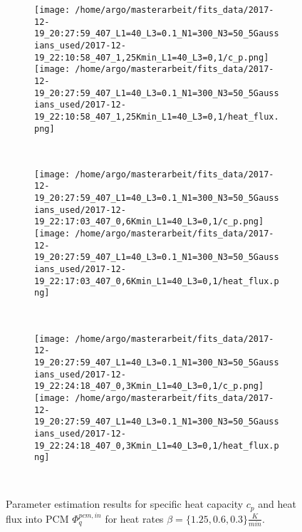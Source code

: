 \documentclass{scrartcl}[12pt, halfparskip]
\numberwithin{equation}{section}
\numberwithin{figure}{section}
\numberwithin{table}{section}
\begin{document}
\begin{figure}[H]
	\begin{subfigure}{1.\textwidth}
		\texttt{[image: /home/argo/masterarbeit/fits\_data/2017-12-19\_20:27:59\_407\_L1=40\_L3=0.1\_N1=300\_N3=50\_5Gaussians\_used/2017-12-19\_22:10:58\_407\_1,25Kmin\_L1=40\_L3=0,1/c\_p.png]}
		\texttt{[image: /home/argo/masterarbeit/fits\_data/2017-12-19\_20:27:59\_407\_L1=40\_L3=0.1\_N1=300\_N3=50\_5Gaussians\_used/2017-12-19\_22:10:58\_407\_1,25Kmin\_L1=40\_L3=0,1/heat\_flux.png]}
	\end{subfigure} \\[1ex]
	
	
	\begin{subfigure}{1.\textwidth}
		\texttt{[image: /home/argo/masterarbeit/fits\_data/2017-12-19\_20:27:59\_407\_L1=40\_L3=0.1\_N1=300\_N3=50\_5Gaussians\_used/2017-12-19\_22:17:03\_407\_0,6Kmin\_L1=40\_L3=0,1/c\_p.png]}
		\texttt{[image: /home/argo/masterarbeit/fits\_data/2017-12-19\_20:27:59\_407\_L1=40\_L3=0.1\_N1=300\_N3=50\_5Gaussians\_used/2017-12-19\_22:17:03\_407\_0,6Kmin\_L1=40\_L3=0,1/heat\_flux.png]}
	\end{subfigure} \\[1ex]
	
	
	\begin{subfigure}{1.\textwidth}
		\texttt{[image: /home/argo/masterarbeit/fits\_data/2017-12-19\_20:27:59\_407\_L1=40\_L3=0.1\_N1=300\_N3=50\_5Gaussians\_used/2017-12-19\_22:24:18\_407\_0,3Kmin\_L1=40\_L3=0,1/c\_p.png]}
		\texttt{[image: /home/argo/masterarbeit/fits\_data/2017-12-19\_20:27:59\_407\_L1=40\_L3=0.1\_N1=300\_N3=50\_5Gaussians\_used/2017-12-19\_22:24:18\_407\_0,3Kmin\_L1=40\_L3=0,1/heat\_flux.png]}
	\end{subfigure} \\[1ex]
	
	

	\caption{Parameter estimation results for specific heat capacity $c_p$ and heat flux into PCM $\varPhi_q^{pcm,in}$ for heat rates $\beta=\{ 1.25, 0.6, 0.3 \} \frac{K}{min}$.}
	\label{fig:optim_c_p_heat_flux_5Gaussians_2}
\end{figure}
\end{document}
